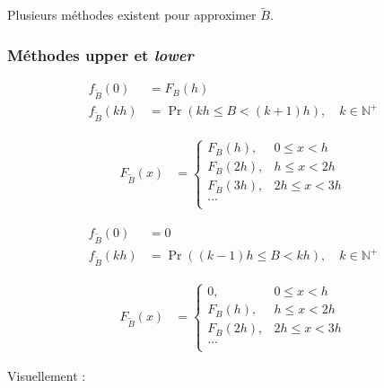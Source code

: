 \documentclass[10pt, french]{article}
\begin{document}
\begin{multicols*}{2}
Plusieurs méthodes existent pour approximer $\tilde{B}$.


\subsubsection{Méthodes \textbf{upper} et \textit{lower}}
\begin{definitionNOHFILLprop}
\begin{align*}
	f_{\tilde{B}}(0)
	&=	F_{B}(h)	\\
	f_{\tilde{B}}(kh)
	&=	\Pr(kh	\leq	B	<	(k + 1)h), \quad k \in \mathbb{N}^{+}
\end{align*}

\begin{align*}
	F_{\tilde{B}}(x)
	&=	\begin{cases}
		F_{B}(h),	&	0	\leq	x	<	h	\\
		F_{B}(2h),	&	h	\leq	x	<	2h	\\
		F_{B}(3h),	&	2h	\leq	x	<	3h	\\
		...	&	\\
		\end{cases}
\end{align*}
\end{definitionNOHFILLprop}

\begin{definitionNOHFILLprop}
\begin{align*}
	f_{\tilde{B}}(0)
	&=	0	\\
	f_{\tilde{B}}(kh)
	&=	\Pr((k - 1)h	\leq	B	<	kh), \quad k \in \mathbb{N}^{+}
\end{align*}

\begin{align*}
	F_{\tilde{B}}(x)
	&=	\begin{cases}
		0,	&	0	\leq	x	<	h	\\
		F_{B}(h),	&	h	\leq	x	<	2h	\\
		F_{B}(2h),	&	2h	\leq	x	<	3h	\\
		...	&	\\
		\end{cases}
\end{align*}
\end{definitionNOHFILLprop}

Visuellement :
\begin{center}


\begin{tikzpicture}[x=0.75pt,y=0.75pt,yscale=-1,xscale=1]


\end{tikzpicture}
\end{center}
\end{multicols*}
\end{document}
